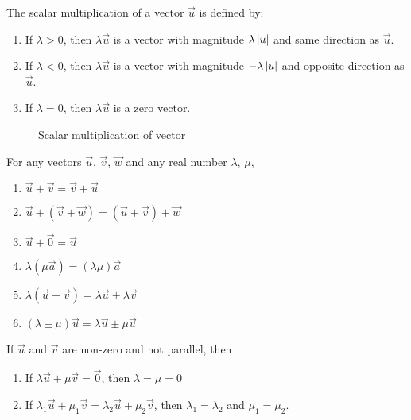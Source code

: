 \documentclass{huhtakm-template-book}
\begin{document}
\begin{defn}
    The scalar multiplication of a vector $\vec{u}$ is defined by:
    \begin{enumerate}
        \item If $\lambda>0$, then $\lambda\vec{u}$ is a vector with magnitude $\lambda\left|{u}\right|$ and same direction as $\vec{u}$.
        \item If $\lambda<0$, then $\lambda\vec{u}$ is a vector with magnitude $-\lambda\left|{u}\right|$ and opposite direction as $\vec{u}$.
        \item If $\lambda=0$, then $\lambda\vec{u}$ is a zero vector.
    \end{enumerate}
\end{defn}
\begin{figure}[h!]
    \centering
    \caption{Scalar multiplication of vector}
    \label{fig:scalar multiplication of vector}
\end{figure}
\newpage
\begin{lem}
    For any vectors $\vec{u}$, $\vec{v}$, $\vec{w}$ and any real number $\lambda$, $\mu$,
    \begin{enumerate}
        \item $\vec{u}+\vec{v}=\vec{v}+\vec{u}$
        \item $\vec{u}+(\vec{v}+\vec{w})=(\vec{u}+\vec{v})+\vec{w}$
        \item $\vec{u}+\vec{0}=\vec{u}$
        \item $\lambda(\mu\vec{a})=(\lambda\mu)\vec{a}$
        \item $\lambda(\vec{u}\pm\vec{v})=\lambda\vec{u}\pm\lambda\vec{v}$
        \item $(\lambda\pm\mu)\vec{u}=\lambda\vec{u}\pm\mu\vec{u}$
    \end{enumerate}
\end{lem}
\begin{thm}
    If $\vec{u}$ and $\vec{v}$ are non-zero and not parallel, then
    \begin{enumerate}
        \item If $\lambda\vec{u}+\mu\vec{v}=\vec{0}$, then $\lambda=\mu=0$
        \item If $\lambda_{1}\vec{u}+\mu_{1}\vec{v}=\lambda_{2}\vec{u}+\mu_{2}\vec{v}$, then $\lambda_{1}=\lambda_{2}$ and $\mu_{1}=\mu_{2}$.
    \end{enumerate}
\end{thm}
\end{document}
